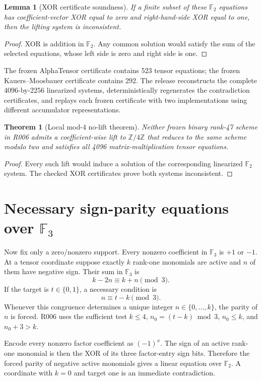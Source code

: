 \documentclass[11pt]{article}
\newtheorem{theorem}{Theorem}
\newtheorem{lemma}{Lemma}
\newcommand{\F}{\mathbb{F}}
\newcommand{\Z}{\mathbb{Z}}
\begin{document}
\begin{lemma}[XOR certificate soundness]
If a finite subset of these $\F_2$ equations has coefficient-vector XOR equal to zero and right-hand-side XOR equal to one, then the lifting system is inconsistent.
\end{lemma}
\begin{proof}
XOR is addition in $\F_2$. Any common solution would satisfy the sum of the selected equations, whose left side is zero and right side is one.
\end{proof}

The frozen AlphaTensor certificate contains 523 tensor equations; the frozen Kauers--Moosbauer certificate contains 292. The release reconstructs the complete 4096-by-2256 linearized systems, deterministically regenerates the contradiction certificates, and replays each frozen certificate with two implementations using different accumulator representations.

\begin{theorem}[Local mod-4 no-lift theorem]
Neither frozen binary rank-47 scheme in R006 admits a coefficient-wise lift to $\Z/4\Z$ that reduces to the same scheme modulo two and satisfies all 4096 matrix-multiplication tensor equations.
\end{theorem}
\begin{proof}
Every such lift would induce a solution of the corresponding linearized $\F_2$ system. The checked XOR certificates prove both systems inconsistent.
\end{proof}

\section{Necessary sign-parity equations over $\F_3$}

Now fix only a zero/nonzero support. Every nonzero coefficient in $\F_3$ is $+1$ or $-1$. At a tensor coordinate suppose exactly $k$ rank-one monomials are active and $n$ of them have negative sign. Their sum in $\F_3$ is
\[
k-2n\equiv k+n\pmod3.
\]
If the target is $t\in\{0,1\}$, a necessary condition is
\[
n\equiv t-k\pmod3.
\]
Whenever this congruence determines a unique integer $n\in\{0,\ldots,k\}$, the parity of $n$ is forced. R006 uses the sufficient test $k\le4$, $n_0=(t-k)\bmod3$, $n_0\le k$, and $n_0+3>k$.

Encode every nonzero factor coefficient as $(-1)^x$. The sign of an active rank-one monomial is then the XOR of its three factor-entry sign bits. Therefore the forced parity of negative active monomials gives a linear equation over $\F_2$. A coordinate with $k=0$ and target one is an immediate contradiction.
\end{document}
